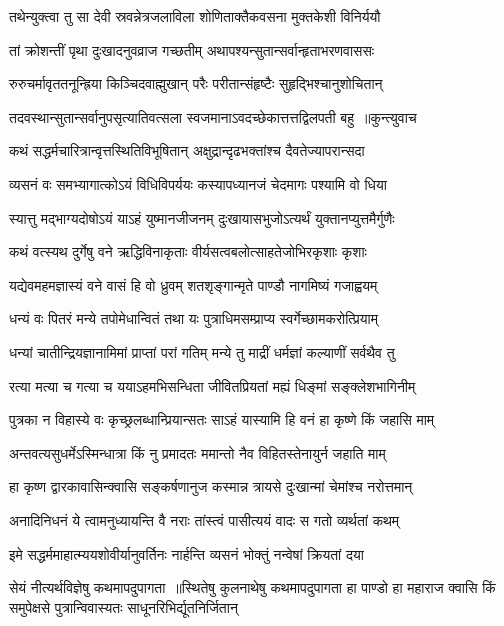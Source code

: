 \twolineshloka
{तथेन्युक्त्वा तु सा देवी स्रवन्नेत्रजलाविला}
{शोणिताक्तैकवसना मुक्तकेशी विनिर्ययौ}


\twolineshloka
{तां क्रोशन्तीं पृथा दुःखादनुवव्राज गच्छतीम्}
{अथापश्यन्सुतान्सर्वान्हृताभरणवाससः}


\twolineshloka
{रुरुचर्मावृततनून्ह्रिया किञ्चिदवाह्मुखान्}
{परैः परीतान्संहृष्टैः सुहृद्भिश्चानुशोचितान्}


\threelineshloka
{तदवस्थान्सुतान्सर्वानुपसृत्यातिवत्सला}
{स्वजमानाऽवदच्छेकात्तत्तद्विलपती बहु ॥कुन्त्युवाच}
{}


\twolineshloka
{कथं सद्धर्मचारित्रान्वृत्तस्थितिविभूषितान्}
{अक्षुद्रान्दृढभक्तांश्च दैवतेज्यापरान्सदा}


\twolineshloka
{व्यसनं वः समभ्यागात्कोऽयं विधिविपर्ययः}
{कस्यापध्यानजं चेदमागः पश्यामि वो धिया}


\twolineshloka
{स्यात्तु मद्भाग्यदोषोऽयं याऽहं युष्मानजीजनम्}
{दुःखायासभुजोऽत्यर्थं युक्तानप्युत्तमैर्गुणैः}


\twolineshloka
{कथं वत्स्यथ दुर्गेषु वने ऋद्धिविनाकृताः}
{वीर्यसत्वबलोत्साहतेजोभिरकृशाः कृशाः}


\twolineshloka
{यद्येवमहमज्ञास्यं वने वासं हि वो ध्रुवम्}
{शतशृङ्गान्मृते पाण्डौ नागमिष्यं गजाह्वयम्}


\twolineshloka
{धन्यं वः पितरं मन्ये तपोमेधान्वितं तथा}
{यः पुत्राधिमसम्प्राप्य स्वर्गेच्छामकरोत्प्रियाम्}


\twolineshloka
{धन्यां चातीन्द्रियज्ञानामिमां प्राप्तां परां गतिम्}
{मन्ये तु माद्रीं धर्मज्ञां कल्याणीं सर्वथैव तु}


\twolineshloka
{रत्या मत्या च गत्या च ययाऽहमभिसन्धिता}
{जीवितप्रियतां मह्यं धिङ्मां सङ्क्लेशभागिनीम्}


\threelineshloka
{पुत्रका न विहास्ये वः कृच्छ्रलब्धान्प्रियान्सतः}
{साऽहं यास्यामि हि वनं हा कृष्णे किं जहासि माम्}
{}


\twolineshloka
{अन्तवत्यसुधर्मेऽस्मिन्धात्रा किं नु प्रमादतः}
{ममान्तो नैव विहितस्तेनायुर्न जहाति माम्}


\twolineshloka
{हा कृष्ण द्वारकावासिन्क्वासि सङ्कर्षणानुज}
{कस्मान्न त्रायसे दुःखान्मां चेमांश्च नरोत्तमान्}


\twolineshloka
{अनादिनिधनं ये त्वामनुध्यायन्ति वै नराः}
{तांस्त्वं पासीत्ययं वादः स गतो व्यर्थतां कथम्}


\twolineshloka
{इमे सद्धर्ममाहात्म्ययशोवीर्यानुवर्तिनः}
{नार्हन्ति व्यसनं भोक्तुं नन्वेषां क्रियतां दया}


सेयं नीत्यर्थविज्ञेषु कथमापदुपागता ॥स्थितेषु कुलनाथेषु कथमापदुपागता
\twolineshloka
{हा पाण्डो हा महाराज क्वासि किं समुपेक्षसे}
{पुत्रान्विवास्यतः साधूनरिभिर्द्यूतनिर्जितान्}


